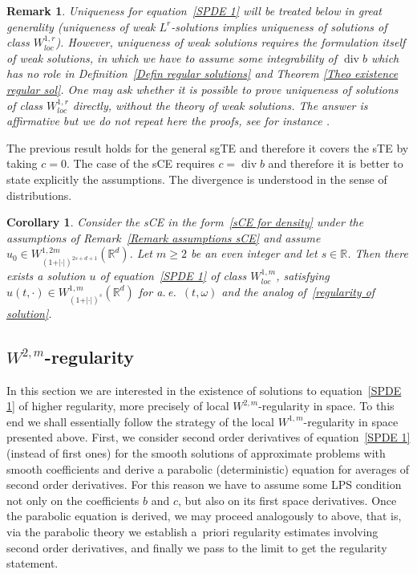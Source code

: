 \documentclass[a4paper,10pt]{article}
\newtheorem{corollary}[theorem]{Corollary}
\newtheorem{remark}[theorem]{Remark}
\begin{document}
\begin{remark}
\label{Remark uniqueness regular}Uniqueness for equation~\eqref{SPDE 1} will
be treated below in great generality (uniqueness of weak $L^{r}$-solutions
implies uniqueness of solutions of class $W_{loc}^{1,r}$). However, uniqueness
of weak solutions requires the formulation itself of weak solutions, in which
we have to assume some integrability of $\operatorname{div}b$ which has no
role in Definition~\ref{Defin regular solutions} and Theorem
\ref{Theo existence regular sol}. One may ask whether it is possible to prove
uniqueness of solutions of class $W_{loc}^{1,r}$ directly, without the theory
of weak solutions. The answer is affirmative but we do not repeat here the
proofs, see for instance \cite[Appendix A]{FLAGUBPRI10}.
\end{remark}

The previous result holds for the general sgTE and therefore it covers the sTE
by taking $c=0$. The case of the sCE requires $c=\operatorname{div}b$ and
therefore it is better to state explicitly the assumptions. The divergence is
understood in the sense of distributions.

\begin{corollary}
Consider the sCE in the form~\eqref{sCE for density} under the assumptions of
Remark~\ref{Remark assumptions sCE} and assume $u_{0}\in W_{(1+\vert \cdot\vert )^{2s+d+1}}^{1,2m}(\mathbb{R}^{d})$. Let $m\geq2$ be an even integer and let $s\in\mathbb{R}$. Then there exists a solution $u$ of equation~\eqref{SPDE 1} of class $W_{loc}^{1,m}$, satisfying $u(t,\cdot)\in W_{(  1+\vert \cdot \vert )^{s}}^{1,m}(\mathbb{R}^{d})$ for a.\,e.\ $(t,\omega)$
and the analog of~\eqref{regularity of solution}.
\end{corollary}

\subsection{$W^{2,m}$-regularity}\label{Section W^2}

In this section we are interested in the existence of solutions to equation~\eqref{SPDE 1} of higher regularity, more precisely of local $W^{2,m}$-regularity in space. To this end we shall essentially follow the strategy of the local $W^{1,m}$-regularity in space presented above. First, we consider second order derivatives of equation~\eqref{SPDE 1} (instead of first ones) for the smooth solutions of approximate problems with smooth coefficients and derive a parabolic (deterministic) equation for averages of second order derivatives. For this reason we have to assume some LPS condition not only on the coefficients $b$ and $c$, but also on its first space derivatives. Once the parabolic equation is derived, we may proceed analogously to above, that is, via the parabolic theory we establish a~priori regularity estimates involving second order derivatives, and finally we pass to the limit to get the regularity statement. 
\end{document}
